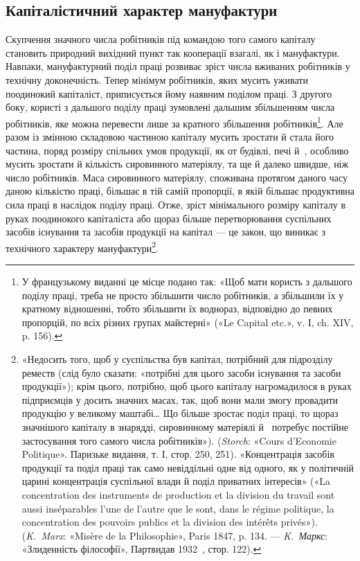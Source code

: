 
\subsection{Капіталістичний характер мануфактури}

Скупчення значного числа робітників під командою того
самого капіталу становить природний вихідний пункт так кооперації
взагалі, як і мануфактури. Навпаки, мануфактурний поділ
праці розвиває зріст числа вживаних робітників у технічну
доконечність. Тепер мінімум робітників, яких мусить уживати
поодинокий капіталіст, приписується йому наявним поділом
праці. З другого боку, користі з дальшого поділу праці зумовлені
дальшим збільшенням числа робітників, яке можна перевести
лише за кратного збільшення робітників\footnote*{
У французькому виданні це місце подано так: «Щоб мати користь
з дальшого поділу праці, треба не просто збільшити число робітників, а
збільшили їх у кратному відношенні, тобто збільшити їх воднораз,
відповідно до певних пропорцій, по всіх різних групах майстерні» («Le
Capital etc.», v. І, ch. XIV, p. 156). 
}. Але разом із
змінною складовою частиною капіталу мусить зростати й стала
його частина, поряд розміру спільних умов продукції, як от
будівлі, печі й~, особливо мусить зростати й кількість сировинного
матеріялу, та ще й далеко швидше, ніж число робітників.
Маса сировинного матеріялу, споживана протягом даного
часу даною кількістю праці, більшає в тій самій пропорції, в
якій більшає продуктивна сила праці в наслідок поділу праці.
Отже, зріст мінімального розміру капіталу в руках поодинокого
капіталіста або щораз більше перетворювання суспільних засобів
існування та засобів продукції на капітал — це закон, що
виникає з технічного характеру мануфактури\footnote{
«Недосить того, щоб у суспільства був капітал, потрібний для
підрозділу реместв (слід було сказати: «потрібні для цього засоби
існування та засоби продукції»); крім цього, потрібно, щоб цього капіталу
нагромадилося в руках підприємців у досить значних масах, так, щоб
вони мали змогу провадити продукцію у великому маштабі\dots{} Що більше
зростає поділ праці, то щораз значнішого капіталу в знарядді,
сировинному матеріялі й~ потребує постійне застосування того самого числа
робітників»). (\emph{Storch}: «Cours d’Economie Politique». Паризьке видання,
т. І, стор. 250, 251). «Концентрація засобів продукції та поділ
праці так само невіддільні одне від одного, як у політичній царині
концентрація суспільної влади й поділ приватних інтересів» («La
concentration des instruments de production et la division du travail sont aussi
inséparables l’une de l’autre que le sont, dans le régime politique, la
concentration des pouvoirs publics et la division des intérêts privés»).
(\emph{K.~Marx}: «Misère de la Philosophie», Paris 1847, p. 134. — \emph{K.~Маркс}:
«Злиденність філософії», Партвидав 1932~, стор. 122).
}.

